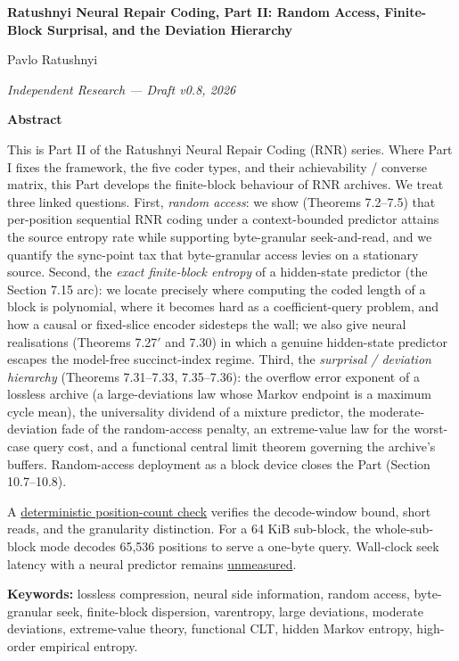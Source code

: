 \documentclass[
]{article}
\author{}
\date{}
\begin{document}
\textbf{Ratushnyi Neural Repair Coding, Part II: Random Access,
Finite-Block Surprisal, and the Deviation Hierarchy}

Pavlo Ratushnyi

\emph{Independent Research --- Draft v0.8, 2026}

\textbf{Abstract}

This is Part II of the Ratushnyi Neural Repair Coding (RNR) series. Where
Part I fixes the framework, the five coder types, and their achievability /
converse matrix, this Part develops the finite-block behaviour of RNR
archives. We treat three linked questions. First, \emph{random access}: we
show (Theorems 7.2--7.5) that per-position sequential RNR coding under a
context-bounded predictor attains the source entropy rate while supporting
byte-granular seek-and-read, and we quantify the sync-point tax that
byte-granular access levies on a stationary source. Second, the
\emph{exact finite-block entropy} of a hidden-state predictor (the
Section 7.15 arc): we locate precisely where computing the coded length of
a block is polynomial, where it becomes hard as a coefficient-query
problem, and how a causal or fixed-slice encoder sidesteps the wall; we
also give neural realisations (Theorems 7.27$'$ and 7.30) in which a
genuine hidden-state predictor escapes the model-free succinct-index
regime. Third, the \emph{surprisal / deviation hierarchy} (Theorems
7.31--7.33, 7.35--7.36): the overflow error exponent of a lossless archive
(a large-deviations law whose Markov endpoint is a maximum cycle mean), the
universality dividend of a mixture predictor, the moderate-deviation fade
of the random-access penalty, an extreme-value law for the worst-case
query cost, and a functional central limit theorem governing the archive's
buffers. Random-access deployment as a block device closes the Part
(Section 10.7--10.8).

A \href{https://github.com/ratushnyi-labs/sci-rnr/blob/d287c6f18fa8dccbbca10b705e408c6e528edfb3/scripts/verify/bug_008_random_access_cost.py}{deterministic position-count check}
verifies the decode-window bound, short reads, and the granularity
distinction. For a 64 KiB sub-block, the whole-sub-block mode decodes
65,536 positions to serve a one-byte query. Wall-clock seek latency with a
neural predictor remains
\href{https://github.com/ratushnyi-labs/sci-rnr/blob/d287c6f18fa8dccbbca10b705e408c6e528edfb3/docs/backlog/blocked/BUG-008-D-measure-seek-latency-external.md}{unmeasured}.

\textbf{Keywords:} lossless compression, neural side information, random
access, byte-granular seek, finite-block dispersion, varentropy,
large deviations, moderate deviations, extreme-value theory, functional CLT,
hidden Markov entropy, high-order empirical entropy.
\end{document}
